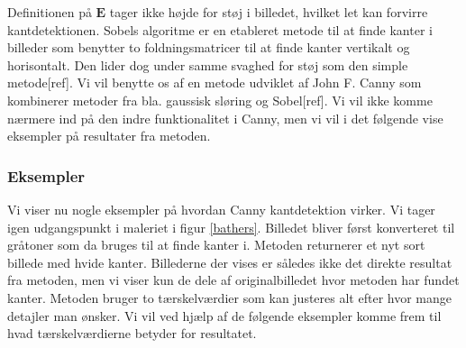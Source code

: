 {Definitionen på $\mathbf{E}$ tager ikke højde for støj i billedet,
hvilket let kan forvirre kantdetektionen. Sobels algoritme er en
etableret metode til at finde kanter i billeder som benytter to
foldningsmatricer til at finde kanter vertikalt og horisontalt. Den
lider dog under samme svaghed for støj som den simple metode[ref]. Vi
vil benytte os af en metode udviklet af John F. Canny som kombinerer
metoder fra bla. gaussisk sløring og Sobel[ref]. Vi vil ikke komme
nærmere ind på den indre funktionalitet i Canny, men vi vil i det
følgende vise eksempler på resultater fra metoden.

\subsubsection*{Eksempler}
Vi viser nu nogle eksempler på hvordan Canny kantdetektion virker. Vi
tager igen udgangspunkt i maleriet i figur \ref{bathers}. Billedet
bliver først konverteret til gråtoner som da bruges til at finde kanter
i. Metoden returnerer et nyt sort billede med hvide kanter. Billederne
der vises er således ikke det direkte resultat fra metoden, men vi viser
kun de dele af originalbilledet hvor metoden har fundet kanter. Metoden
bruger to tærskelværdier som kan justeres alt efter hvor mange detajler
man ønsker. Vi vil ved hjælp af de følgende eksempler komme frem til
hvad tærskelværdierne betyder for resultatet.

}
